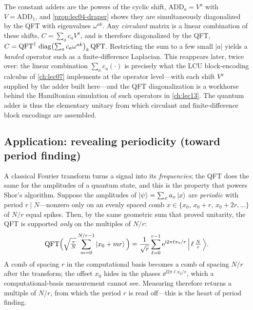 \begin{remark}
\label{rem:lec04-adder-lcu}
The constant adders are the powers of the cyclic shift, $\mathrm{ADD}_a=V^{a}$
with $V=\mathrm{ADD}_1$, and \cref{prop:lec04-draper} shows they are
simultaneously diagonalized by the QFT with eigenvalues $\omega^{ak}$. Any
\emph{circulant} matrix is a linear combination of these shifts,
$C=\sum_{a}c_a V^{a}$, and is therefore diagonalized by the QFT,
$C=\mathrm{QFT}^{\dagger}\,\operatorname{diag}\bigl(\textstyle\sum_a c_a\omega^{ak}\bigr)_{k}\,\mathrm{QFT}$.
Restricting the sum to a few small $|a|$ yields a \emph{banded} operator such as a
finite-difference Laplacian. This reappears later, twice over: the linear
combination $\sum_a c_a(\cdot)$ is precisely what the LCU block-encoding calculus
of \cref{ch:lec07} implements at the operator level---with each shift $V^a$
supplied by the adder built here---and the QFT diagonalization is a workhorse
behind the Hamiltonian simulation of such operators in \cref{ch:lec13}. The
quantum adder is thus the elementary unitary from which circulant and
finite-difference block encodings are assembled.
\end{remark}

\subsection*{Application: revealing periodicity (toward period finding)}
\label{sec:lec04-period}

A classical Fourier transform turns a signal into its \emph{frequencies}; the QFT does
the same for the amplitudes of a quantum state, and this is the property that powers
Shor's algorithm. Suppose the amplitudes of $\ket{\psi}=\sum_x a_x\ket{x}$ are
\emph{periodic} with period $r\mid N$---nonzero only on an evenly spaced comb
$x\in\{x_0,\,x_0+r,\,x_0+2r,\dots\}$ of $N/r$ equal spikes. Then, by the same geometric
sum that proved unitarity, the QFT is supported \emph{only} on the multiples of $N/r$:
\[
  \mathrm{QFT}\Big(\sqrt{\tfrac{r}{N}}\sum_{m=0}^{N/r-1}\ket{x_0+mr}\Big)
  =\frac{1}{\sqrt{r}}\sum_{\ell=0}^{r-1}\mathrm{e}^{\mathrm{i} 2\pi \ell x_0/r}\,\Big|\,\ell\,\tfrac{N}{r}\,\Big\rangle .
\]
A comb of spacing $r$ in the computational basis becomes a comb of spacing $N/r$ after
the transform; the offset $x_0$ hides in the phases $\ee^{\ii 2\pi\ell x_0/r}$, which a
computational-basis measurement cannot see. Measuring therefore returns a multiple of
$N/r$, from which the period $r$ is read off---this is the heart of period finding.

